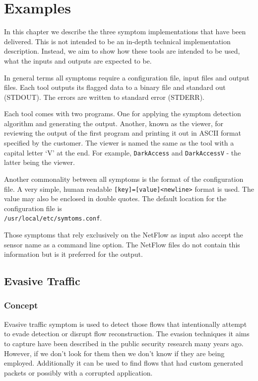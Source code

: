 \documentclass[titlepage,12pt]{report}
\begin{document}
\chapter{Examples}
In this chapter we describe the three symptom implementations that have been delivered. This is not intended to be an in-depth technical implementation description. Instead, we aim to show how these tools are intended to be used, what the inputs and outputs are expected to be.

In general terms all symptoms require a configuration file, input files and output files. Each tool outputs its flagged data to a binary file and standard out (STDOUT). The errors are written to standard error (STDERR).

Each tool comes with two programs. One for applying the symptom detection algorithm and generating the output. Another, known as the viewer, for reviewing the output of the first program and printing it out in ASCII format specified by the customer. The viewer is named the same as the tool with a capital letter `V' at the end. For example, \texttt{DarkAccess} and \texttt{DarkAccessV} - the latter being the viewer.

Another commonality between all symptoms is the format of the configuration file. A very simple, human readable \verb|[key]=[value]<newline>| format is used. The value may also be enclosed in double quotes. The default location for the configuration file is \\ \verb|/usr/local/etc/symtoms.conf|.

Those symptoms that rely exclusively on the NetFlow as input also accept the sensor name as a command line option. The NetFlow files do not contain this information but is it preferred for the output.

\section{Evasive Traffic}
\subsection{Concept}
Evasive traffic symptom is used to detect those flows that intentionally attempt to evade detection or disrupt flow reconstruction. The evasion techniques it aims to capture have been described in the public security research many years ago. However, if we don't look for them then we don't know if they are being employed. Additionally it can be used to find flows that had custom generated packets or possibly with a corrupted application.
\end{document}
